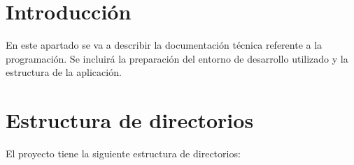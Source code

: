 
\section{Introducción}

En este apartado se va a describir la documentación técnica referente a la programación. Se incluirá la preparación del entorno de desarrollo utilizado y la estructura de la aplicación.

\section{Estructura de directorios}

El proyecto tiene la siguiente estructura de directorios:

